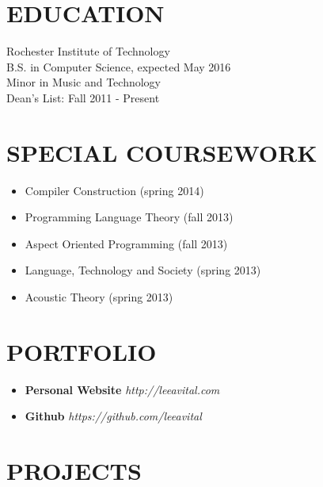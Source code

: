 \documentclass[line,margin]{res}
\begin{document}
\address{80 Colony Manor Drive, Apartment 5\\ Rochester, NY 14623}
\address{(646) 320-9143\\leeavital@gmail.com}


\begin{resume}
 
\section{EDUCATION}  Rochester Institute of Technology \\ 
                     B.S. in  Computer Science,  expected May 2016 \\
	                 Minor in Music and Technology\\
	                 Dean's List: Fall 2011 - Present


\section{SPECIAL COURSEWORK}
\begin{itemize} \itemsep -2pt
   \item Compiler Construction (spring 2014)
   \item Programming Language Theory (fall 2013)
   \item Aspect Oriented Programming (fall 2013)
   \item Language, Technology and Society (spring 2013)
   \item Acoustic Theory (spring 2013)
\end{itemize}


\section{PORTFOLIO}

\begin{itemize} \itemsep -2pt
   \item {\bf Personal Website}  {\sl http://leeavital.com}
   \item {\bf Github}	{\sl  https://github.com/leeavital }
\end{itemize}



\section{PROJECTS}


\end{resume}
\end{document}
